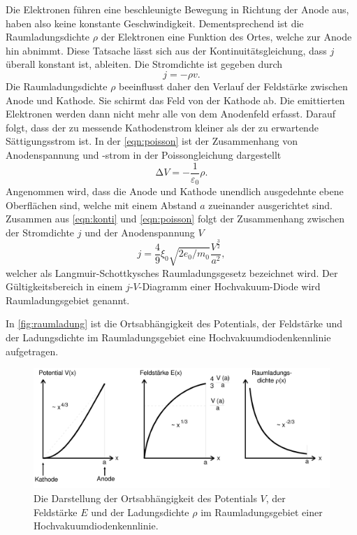 Die Elektronen führen eine beschleunigte Bewegung in Richtung der Anode aus, haben also keine konstante Geschwindigkeit.
Dementsprechend ist die Raumladungsdichte $\rho$ der Elektronen eine Funktion des Ortes, welche zur Anode hin abnimmt. Diese
Tatsache lässt sich aus der Kontinuitätsgleichung, dass $j$ überall konstant ist, ableiten. Die Stromdichte ist gegeben durch
\begin{equation}
    j = - \rho v .
\label{eqn:konti}
\end{equation}
Die Raumladungsdichte $\rho$ beeinflusst daher den Verlauf der Feldstärke zwischen Anode und Kathode.
Sie schirmt das Feld von der Kathode ab. Die emittierten Elektronen werden dann nicht mehr alle von dem
Anodenfeld erfasst. Darauf folgt, dass der zu messende Kathodenstrom kleiner als der zu erwartende Sättigungsstrom ist.
In der \autoref{eqn:poisson} ist der Zusammenhang von Anodenspannung und -strom in der Poissongleichung dargestellt
\begin{equation}
    \increment V = - \frac{1}{\varepsilon_0}\rho .
    \label{eqn:poisson}
\end{equation} 
Angenommen wird, dass die Anode und Kathode unendlich ausgedehnte ebene Oberflächen sind, welche
mit einem Abstand $a$ zueinander ausgerichtet sind.
Zusammen aus \autoref{eqn:konti} und \autoref{eqn:poisson} folgt der Zusammenhang
zwischen der Stromdichte $j$ und der Anodenspannung $V$
\begin{equation}
    j = \frac{4}{9} \xi_0 \sqrt{2 e_0/m_0} \frac{V^{\frac{3}{2}}}{a^2} ,
\label{eqn:langmuir}
\end{equation}
welcher als Langmuir-Schottkysches Raumladungsgesetz bezeichnet wird. Der Gültigkeitsbereich 
in einem $j$-$V$-Diagramm einer Hochvakuum-Diode wird Raumladungsgebiet genannt.

In \autoref{fig:raumladung} ist die Ortsabhängigkeit des Potentials, der Feldstärke und der Ladungsdichte im Raumladungsgebiet
eine Hochvakuumdiodenkennlinie aufgetragen.

\begin{figure}[H]
    \centering
    \includegraphics[width=0.5\linewidth]{content/grafik/raumladung.png}
    \caption{Die Darstellung der Ortsabhängigkeit des Potentials $V$, der Feldstärke $E$ und der Ladungsdichte $\rho$ im
    Raumladungsgebiet einer Hochvakuumdiodenkennlinie.\cite{elektron}}
    \label{fig:raumladung}
\end{figure}

